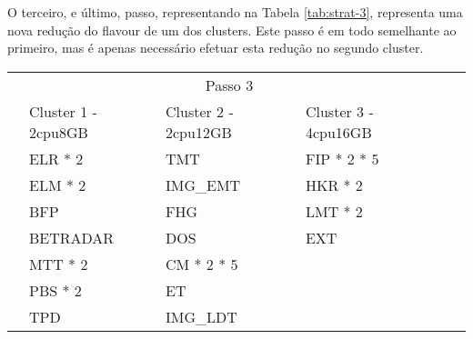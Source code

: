 O terceiro, e último, passo, representando na Tabela \ref{tab:strat-3}, representa uma nova redução 
do \gls{flavour} de um dos \glspl{cluster}. Este passo é em todo semelhante ao primeiro, mas é
apenas necessário efetuar esta redução no segundo \gls{cluster}.

\begin{table}[H]
  \centering
  \small
  \setlength{\extrarowheight}{3pt}
  \setlength{\arrayrulewidth}{1pt}
  
  \begin{tabular}{|l|l|l|l|l|l|}
    \hline
    \cellcolor{white} & \multicolumn{3}{|c|}{\cellcolor[HTML]{FBE6A3}Passo 3} & \cellcolor{white}             & \cellcolor{white}  \\ \cline{2-5} 
                                     & \cellcolor[HTML]{4EAC5B}Cluster 1 - 2cpu8GB & \cellcolor[HTML]{4EAC5B}Cluster 2 - 2cpu12GB & \cellcolor[HTML]{4EAC5B}Cluster 3 - 4cpu16GB &                              & \\ \cline{1-5}
                                     & \cellcolor[HTML]{A9D08E}ELR * 2             & \cellcolor[HTML]{BDD7EE}TMT                & \cellcolor[HTML]{A9D08E}FIP * 2 * 5       &                              & \\ \cline{1-5}
                                     & \cellcolor[HTML]{A9D08E}ELM * 2             & \cellcolor[HTML]{BDD7EE}IMG\_EMT           & \cellcolor[HTML]{A9D08E}HKR * 2           &                              & \\ \cline{1-5}
                                     & \cellcolor[HTML]{A9D08E}BFP                 & \cellcolor[HTML]{BDD7EE}FHG                & \cellcolor[HTML]{BDD7EE}LMT * 2           &                              & \\ \cline{1-5}
                                     & \cellcolor[HTML]{A9D08E}BETRADAR            & \cellcolor[HTML]{BDD7EE}DOS                & \cellcolor[HTML]{BDD7EE}EXT               &                              & \\ \cline{1-5}
                                     & \cellcolor[HTML]{BDD7EE}MTT * 2             & \cellcolor[HTML]{BDD7EE}CM * 2 * 5         &                                           &                              & \\ \cline{1-5}
                                     & \cellcolor[HTML]{BDD7EE}PBS * 2             & \cellcolor[HTML]{BDD7EE}ET     &                                           &                              & \\ \cline{1-5}
                                     & \cellcolor[HTML]{BDD7EE}TPD                 & \cellcolor[HTML]{BDD7EE}IMG\_LDT          &                                           &                              & \\ \cline{1-5}

\end{tabular}
\end{table}
